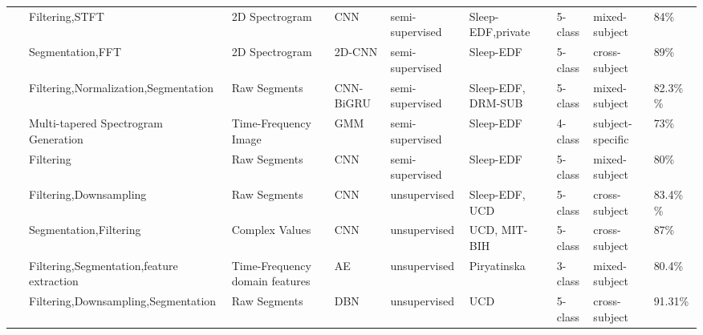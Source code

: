 \begin{table*}[ht]
\begin{tabular}{p{0.4cm}p{2.8cm}p{2cm}p{1.5cm}p{1.9cm}p{1.9cm}p{0.8cm}p{1.8cm}p{2cm}}
~\cite{Sleep65} & Filtering,STFT & 2D Spectrogram & CNN & semi-supervised & Sleep-EDF,\newline private & 5-class  & mixed-subject & 84\% \\
~\cite{Sleep66} & Segmentation,FFT & 2D Spectrogram & 2D-CNN & semi-supervised & Sleep-EDF & 5-class & cross-subject & 89\% \\

~\cite{Sleep67} & Filtering,Normalization,\newline Segmentation & Raw Segments & CNN-BiGRU & semi-supervised & Sleep-EDF, \newline DRM-SUB & 5-class & mixed-subject & 82.3\% \newline
81.6\% \\
~\cite{Sleep68} & Multi-tapered Spectrogram Generation & Time-Frequency Image & GMM & semi-supervised & Sleep-EDF & 4-class & subject-specific & 73\% \\
~\cite{Sleep69} & Filtering & Raw Segments & CNN & semi-supervised & Sleep-EDF & 5-class & mixed-subject & 80\% \\
~\cite{Sleep70} & Filtering,Downsampling & Raw Segments & CNN & unsupervised & Sleep-EDF, \newline UCD & 5-class  & cross-subject & 83.4\% \newline 77.2\% \\
~\cite{Sleep71} & Segmentation,Filtering & Complex Values & CNN & unsupervised & UCD, \newline MIT-BIH & 5-class  & cross-subject & 87\% \\
~\cite{Sleep72} & Filtering,Segmentation,\newline feature extraction & Time-Frequency domain features & AE & unsupervised & Piryatinska & 3-class & mixed-subject & 80.4\% \\
~\cite{Sleep73} & Filtering,Downsampling,\newline Segmentation & Raw Segments & DBN & unsupervised & UCD & 5-class  & cross-subject & 91.31\% \\

\end{tabular}
\end{table*}
